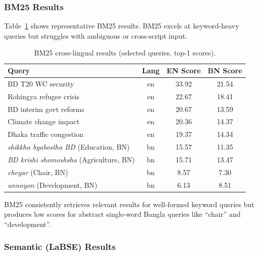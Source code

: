 \documentclass[12pt,a4paper]{article}
\newcommand{\bn}[1]{\textit{#1}}
\begin{document}
\subsubsection{BM25 Results}

Table~\ref{tab:bm25_results} shows representative BM25 results. BM25 excels at keyword-heavy queries but struggles with ambiguous or cross-script input.

\begin{table}[H]
\centering
\caption{BM25 cross-lingual results (selected queries, top-1 scores).}
\label{tab:bm25_results}
\begin{tabular}{p{3.5cm}ccc}
\toprule
\textbf{Query} & \textbf{Lang} & \textbf{EN Score} & \textbf{BN Score} \\
\midrule
BD T20 WC security  & en & 33.92 & 21.54 \\
Rohingya refugee crisis & en & 22.67 & 18.41 \\
BD interim govt reforms & en & 20.67 & 13.59 \\
Climate change impact   & en & 20.36 & 14.37 \\
Dhaka traffic congestion & en & 19.37 & 14.34 \\
\bn{shikkha byabostha BD} (Education, BN) & bn & 15.57 & 11.35 \\
\bn{BD krishi shomoshsha} (Agriculture, BN) & bn & 15.71 & 13.47 \\
\bn{cheyar} (Chair, BN) & bn & 8.57 & 7.30 \\
\bn{unnoyon} (Development, BN) & bn & 6.13 & 8.51 \\
\bottomrule
\end{tabular}
\end{table}

BM25 consistently retrieves relevant results for well-formed keyword queries but produces low scores for abstract single-word Bangla queries like ``chair'' and ``development''.

\subsubsection{Semantic (LaBSE) Results}
\end{document}
